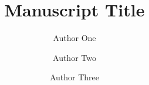 \documentclass{article}
\begin{document}
\newcommand{\pvec}[1]{\vec{#1}\mkern2mu\vphantom{#1}} %

\newcommand*\UnderTilde[1]{ \underaccent{\sim}{#1} }
  
\renewcommand{\figurename}{Fig.}


\def\components{
\left(
\begin{matrix}
    z\cos\gamma_n \vspace{0.3cm} \\
    z\sin\gamma_n\vspace{0.3cm} \\
    -(x-x_n)\cos\gamma_n+(y-y_n)\sin\gamma_n
\end{matrix}
\right)
}

\def\componentsII{
\left(
\begin{matrix}
    z\cos\gamma_n \vspace{0.3cm} \\
    z\sin\gamma_n\vspace{0.3cm} \\
    \mathscr{R}_n\cos(\gamma_n+\beta_n)-x\cos\gamma_n+y\sin\gamma_n
\end{matrix}
\right)
}

\def\change{
\scriptsize
\begin{matrix}
    
    y \rightarrow \Lambda_{n}(\boldsymbol{r})
    \vspace{0.05cm} \\
    r \rightarrow \lambda_{n}(\boldsymbol{r})
\end{matrix}
\normalsize
}



\title{Manuscript Title} 
 
\author[1]{Author One}
\author[2]{Author Two}
\author[3]{Author Three}

\end{document}
